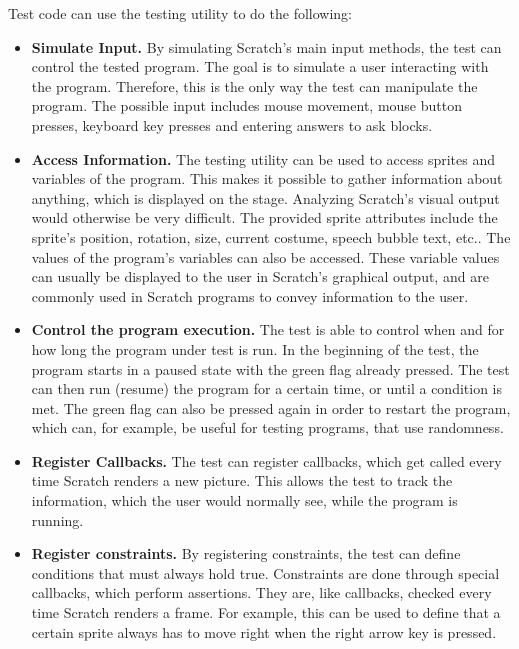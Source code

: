 \noindent Test code can use the testing utility to do the following:
\begin{itemize}
    \item \textbf{Simulate Input.}
        By simulating Scratch's main input methods, the test can control the tested program.
        The goal is to simulate a user interacting with the program.
        Therefore, this is the only way the test can manipulate the program.
        The possible input includes mouse movement, mouse button presses, keyboard key presses and entering answers to ask blocks.
    \item \textbf{Access Information.}
        The testing utility can be used to access sprites and variables of the program.
        This makes it possible to gather information about anything, which is displayed on the stage.
        Analyzing Scratch's visual output would otherwise be very difficult.
        The provided sprite attributes include the sprite's position, rotation, size, current costume, speech bubble text, etc..
        The values of the program's variables can also be accessed.
        These variable values can usually be displayed to the user in Scratch's graphical output, and are commonly used in Scratch programs to convey information to the user.
    \item \textbf{Control the program execution.}
        The test is able to control when and for how long the program under test is run.
        In the beginning of the test, the program starts in a paused state with the green flag already pressed.
        The test can then run (resume) the program for a certain time, or until a condition is met.
        The green flag can also be pressed again in order to restart the program, which can, for example, be useful for testing programs, that use randomness.
    \item \textbf{Register Callbacks.}
        The test can register callbacks, which get called every time Scratch renders a new picture.
        This allows the test to track the information, which the user would normally see, while the program is running.
    \item \textbf{Register constraints.}
        By registering constraints, the test can define conditions that must always hold true.
        Constraints are done through special callbacks, which perform assertions.
        They are, like callbacks, checked every time Scratch renders a frame.
        For example, this can be used to define that a certain sprite always has to move right when the right arrow key is pressed.
\end{itemize}

